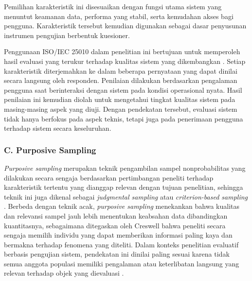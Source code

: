 Pemilihan karakteristik ini disesuaikan dengan fungsi utama sistem yang menuntut keamanan data, performa yang stabil, serta kemudahan akses bagi pengguna. Karakteristik tersebut kemudian digunakan sebagai dasar penyusunan instrumen pengujian berbentuk kuesioner. \par

Penggunaan ISO/IEC 25010 dalam penelitian ini bertujuan untuk memperoleh hasil evaluasi yang terukur terhadap kualitas sistem yang dikembangkan \cite{lamada2024iso}. Setiap karakteristik diterjemahkan ke dalam beberapa pernyataan yang dapat dinilai secara langsung oleh responden. Penilaian dilakukan berdasarkan pengalaman pengguna saat berinteraksi dengan sistem pada kondisi operasional nyata. Hasil penilaian ini kemudian diolah untuk mengetahui tingkat kualitas sistem pada masing-masing aspek yang diuji. Dengan pendekatan tersebut, evaluasi sistem tidak hanya berfokus pada aspek teknis, tetapi juga pada penerimaan pengguna terhadap sistem secara keseluruhan. \par

\subsubsection*{C. Purposive Sampling} \label{II.PurposiveSampling}
\textit{Purposive sampling} merupakan teknik pengambilan sampel nonprobabilitas yang dilakukan secara sengaja berdasarkan pertimbangan peneliti terhadap karakteristik tertentu yang dianggap relevan dengan tujuan penelitian, sehingga teknik ini juga dikenal sebagai \textit{judgmental sampling} atau \textit{criterion-based sampling} \cite{sugiyono2019}. Berbeda dengan teknik acak, \textit{purposive sampling} menekankan bahwa kualitas dan relevansi sampel jauh lebih menentukan keabsahan data dibandingkan kuantitasnya, sebagaimana ditegaskan oleh Creswell \cite{creswell2014} bahwa peneliti secara sengaja memilih individu yang dapat memberikan informasi paling kaya dan bermakna terhadap fenomena yang diteliti. Dalam konteks penelitian evaluatif berbasis pengujian sistem, pendekatan ini dinilai paling sesuai karena tidak semua anggota populasi memiliki pengalaman atau keterlibatan langsung yang relevan terhadap objek yang dievaluasi \cite{neuman2014}. \par

